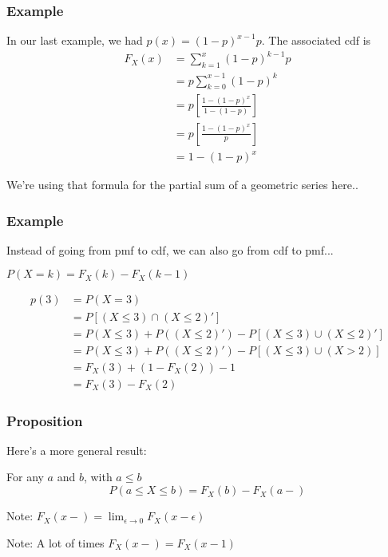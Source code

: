 \documentclass{beamer}
\begin{document}
\begin{frame}
\frametitle{Example}

In our last example, we had $p(x) = (1-p)^{x-1}p$. The associated cdf is 
\begin{align*}
F_X(x) &= \sum_{k  =1}^x(1-p)^{k-1}p \\
&= p\sum_{k  = 0}^{x-1}(1-p)^{k} \\
&= p \left[ \frac{1 - (1-p)^x}{1 - (1-p)} \right] \\
&= p \left[ \frac{1 - (1-p)^x}{p} \right] \\
&=  1 - (1-p)^x 
\end{align*}

We're using that formula for the partial sum of a geometric series here..


\end{frame}


\begin{frame}
\frametitle{Example}

Instead of going from pmf to cdf, we can also go from cdf to pmf...
\newline

$P(X=k) = F_X(k) - F_X(k-1)$
\newline

\begin{align*}
p(3) &= P(X=3) \\
&= P\left[ (X \le 3) \cap (X \le 2)'\right] \\
&= P(X \le 3) + P((X \le 2)') - P\left[ (X \le 3) \cup (X \le 2)'\right] \\
&= P(X \le 3) + P((X \le 2)') - P\left[ (X \le 3) \cup (X > 2)\right] \\
&= F_X(3) + (1 - F_X(2)) - 1 \\
&= F_X(3) - F_X(2)
\end{align*}


\end{frame}



\begin{frame}
\frametitle{Proposition}

Here's a more general result:
\newline

For any $a$ and $b$, with $a \le b$
\[
P(a \le X \le b) = F_X(b) - F_X(a-)
\]

Note: $F_X(x-) = \lim_{\epsilon \to 0} F_X(x-\epsilon)$
\newline

Note: A lot of times $F_X(x-) = F_X(x-1)$



\end{frame}
\end{document}
